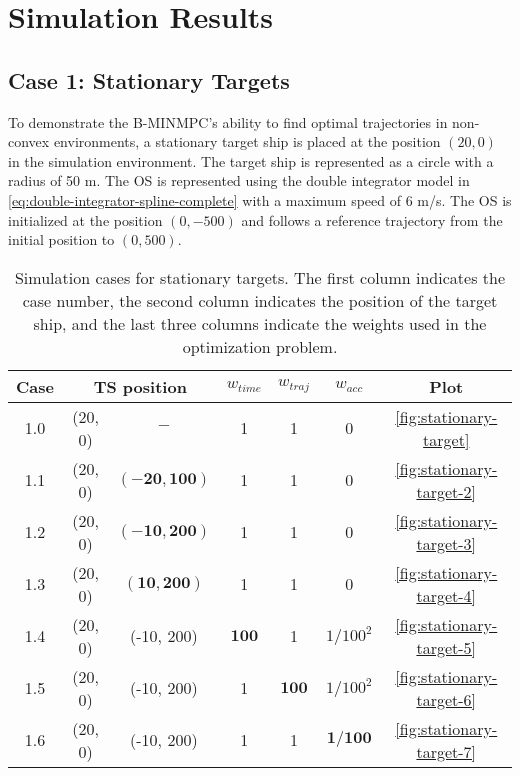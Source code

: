 \section{Simulation Results}\label{sec:simulation-results}


\subsection{Case 1: Stationary Targets}
\label{sec:case-1-stationary-targets}

To demonstrate the B-MINMPC's ability to find optimal trajectories in non-convex environments, a stationary target ship is placed at the position $(20, 0)$ in the simulation environment. The target ship is represented as a circle with a radius of 50 m. The OS is represented using the double integrator model in \cref{eq:double-integrator-spline-complete} with a maximum speed of 6 m/s. The OS is initialized at the position $(0, -500)$ and follows a reference trajectory from the initial position to $(0, 500)$. 

\begin{table}
    \centering
    \begin{tabular}{|c|c|c|c|c|c|c|}
        \hline
        Case & \multicolumn{2}{c|}{TS position} & $w_{time}$ & $w_{traj}$ & $w_{acc}$ & Plot \\
        \hline
        1.0 & (20, 0) & $-$ & 1 & 1 & 0 & \cref{fig:stationary-target} \\
        \hline
        1.1 & (20, 0) & $\mathbf{(-20, 100)}$ & 1 & 1 & 0 & \cref{fig:stationary-target-2} \\
        \hline
        1.2 & (20, 0) & $\mathbf{(-10, 200)}$ & 1 & 1 & 0 & \cref{fig:stationary-target-3} \\
        \hline
        1.3 & (20, 0) & $\mathbf{(10, 200)}$ & 1 & 1 & 0 & \cref{fig:stationary-target-4} \\
        \hline
        1.4 & (20, 0) & (-10, 200) & $\mathbf{100}$ & 1 & $1/100^2$ & \cref{fig:stationary-target-5} \\
        \hline
        1.5 & (20, 0) & (-10, 200) & 1 & $\mathbf{100}$ & $1/100^2$ & \cref{fig:stationary-target-6} \\
        \hline
        1.6 & (20, 0) & (-10, 200) & 1 & 1 & $\mathbf{1/100}$ & \cref{fig:stationary-target-7} \\
        \hline
    \end{tabular}
    \caption{Simulation cases for stationary targets. The first column indicates the case number, the second column indicates the position of the target ship, and the last three columns indicate the weights used in the optimization problem.}
    \label{tab:stationary-targets}
\end{table}



